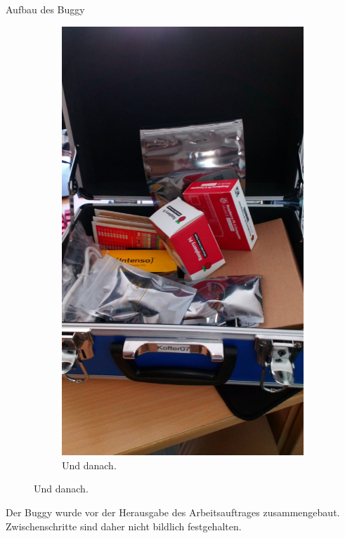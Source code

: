 \documentclass[12pt]{report}
\begin{document}
\begin{section}{Aufbau des Buggy}
\begin{figure}[h!]
  \begin{subfigure}{0.45\linewidth}
    \includegraphics[width=\linewidth]{lernportfolio_assets/Buggy_Koffer.jpeg}
    \caption{Und danach.}
  \end{subfigure}
\end{figure}

Der Buggy wurde vor der Herausgabe des Arbeitsauftrages zusammengebaut. Zwischenschritte sind daher nicht bildlich festgehalten. 


\end{section}
\end{document}
